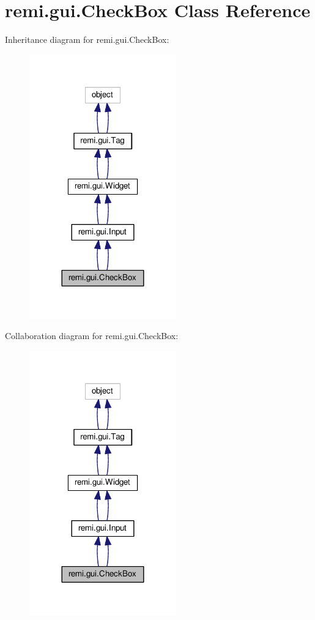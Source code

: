 \hypertarget{classremi_1_1gui_1_1CheckBox}{}\section{remi.\+gui.\+Check\+Box Class Reference}
\label{classremi_1_1gui_1_1CheckBox}


Inheritance diagram for remi.\+gui.\+Check\+Box\+:
\nopagebreak
\begin{figure}[H]
\begin{center}
\leavevmode
\includegraphics[width=180pt]{db/d2e/classremi_1_1gui_1_1CheckBox__inherit__graph}
\end{center}
\end{figure}


Collaboration diagram for remi.\+gui.\+Check\+Box\+:
\nopagebreak
\begin{figure}[H]
\begin{center}
\leavevmode
\includegraphics[width=180pt]{db/d6f/classremi_1_1gui_1_1CheckBox__coll__graph}
\end{center}
\end{figure}
